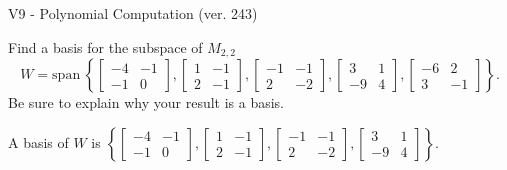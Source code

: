 \begin{exercise}
  \begin{exerciseTitle}V9 - Polynomial Computation (ver. 243)\end{exerciseTitle}
  \begin{exerciseStatement}
    Find a basis for the subspace of \(M_{2,2}\) 
\[W=\mathrm{span}\ \left\{\left[\begin{array}{cc}
-4 & -1 \\
-1 & 0
\end{array}\right] , \left[\begin{array}{cc}
1 & -1 \\
2 & -1
\end{array}\right] , \left[\begin{array}{cc}
-1 & -1 \\
2 & -2
\end{array}\right] , \left[\begin{array}{cc}
3 & 1 \\
-9 & 4
\end{array}\right] , \left[\begin{array}{cc}
-6 & 2 \\
3 & -1
\end{array}\right]\right\}.\]
 Be sure to explain why your result is a basis.


  \end{exerciseStatement}
  \begin{exerciseAnswer}
   A basis of \(W\) is  \(\left\{\left[\begin{array}{cc}
-4 & -1 \\
-1 & 0
\end{array}\right] , \left[\begin{array}{cc}
1 & -1 \\
2 & -1
\end{array}\right] , \left[\begin{array}{cc}
-1 & -1 \\
2 & -2
\end{array}\right] , \left[\begin{array}{cc}
3 & 1 \\
-9 & 4
\end{array}\right]\right\}\).
  


  \end{exerciseAnswer}
\end{exercise}